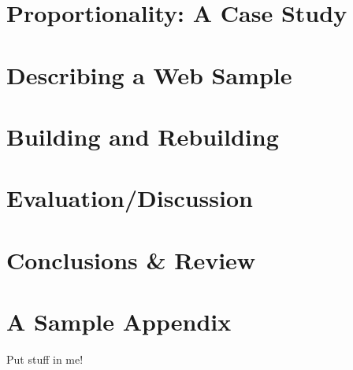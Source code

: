 \documentclass[10pt,oneside,a4paper,onecolumn,titlepage,draft]{lancsthesis}
\begin{document}
\chapter{Proportionality: A Case Study}




\chapter{Describing a Web Sample}



\chapter{Building and Rebuilding}


\chapter{Evaluation/Discussion}


\chapter{Conclusions \& Review}



\pagebreak%
%
\backmatter%



\pagebreak
\appendix
{}


\chapter{A Sample Appendix}
Put stuff in me!


\end{document}
